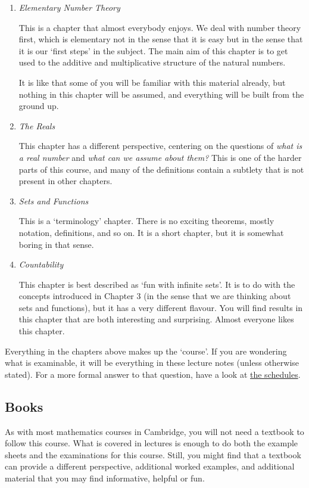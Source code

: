 \documentclass[a4]{scrartcl}
\begin{document}
\begin{enumerate}
	\item \emph{Elementary Number Theory}
	
	This is a chapter that almost everybody enjoys. 
	We deal with number theory first, which is elementary not in the sense that it is easy but in the sense that it is our `first steps' in the subject. The main aim of this chapter is to get used to the additive and multiplicative structure of the natural numbers.

	It is like that some of you will be familiar with this material already, but nothing in this chapter will be assumed, and everything will be built from the ground up.

	\item \emph{The Reals}
	
	This chapter has a different perspective, centering on the questions of \emph{what is a real number} and \emph{what can we assume about them?} This is one of the harder parts of this course, and many of the definitions contain a subtlety that is not present in other chapters. 

	\item \emph{Sets and Functions}
	
	This is a `terminology' chapter. There is no exciting theorems, mostly notation, definitions, and so on. It is a short chapter, but it is somewhat boring in that sense.

	\item \emph{Countability}
	
	This chapter is best described as `fun with infinite sets'. It is to do with the concepts introduced in Chapter 3 (in the sense that we are thinking about sets and functions), but it has a very different flavour. You will find results in this chapter that are both interesting and surprising. Almost everyone likes this chapter.
\end{enumerate}

Everything in the chapters above makes up the `course'. If you are wondering what is examinable, it will be everything in these lecture notes (unless otherwise stated). For a more formal answer to that question, have a look at \href{https://www.maths.cam.ac.uk/undergrad/files/schedules.pdf}{the schedules}.

\subsection{Books}

As with most mathematics courses in Cambridge, you will not need a textbook to follow this course. What is covered in lectures is enough to do both the example sheets and the examinations for this course. Still, you might find that a textbook can provide a different perspective, additional worked examples, and additional material that you may find informative, helpful or fun.
\end{document}
